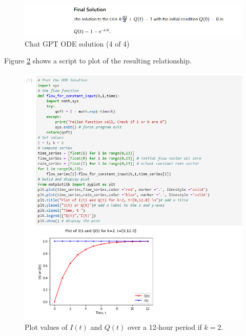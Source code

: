 \documentclass[12pt]{article}
\begin{document}
\begin{enumerate}
\begin{figure}[h!] %
   \centering
   \includegraphics[width=6in]{chatgpt4of4.png} 
   \caption{Chat GPT ODE solution (4 of 4)}
   \label{fig:chatgpt4of4}
\end{figure}

\clearpage

Figure \ref{fig:es1-pr4-jupyter} shows a script to plot of the resulting relationship.

\begin{figure}[h!] %
   \centering
   \includegraphics[width=6in]{es1-pr4-jupyter.png} 
   \caption{Plot values of $I(t)$ and $Q(t)$ over a 12-hour period if $k=2$.}
   \label{fig:es1-pr4-jupyter}
\end{figure}
 
\clearpage

%
 

\end{enumerate}
\end{document}
